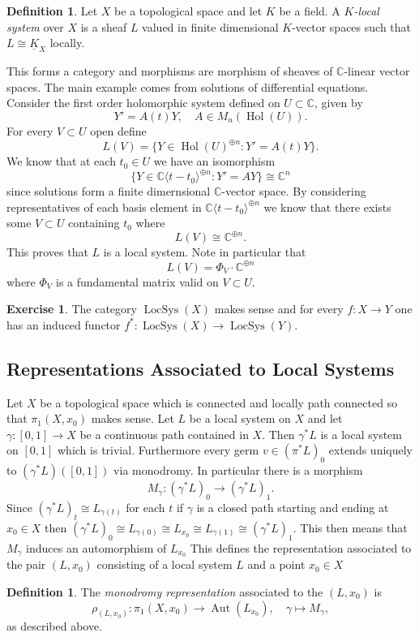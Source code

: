 \documentclass[12pt]{book}
\numberwithin{equation}{section}
\theoremstyle{definition}
\newtheorem{definition}[theorem]{Definition}
\newtheorem{exercise}[theorem]{Exercise}
\theoremstyle{remark}
\newcommand{\CC}{\mathbb{C}}
\newcommand{\Aut}{\operatorname{Aut}}
\newcommand{\hol}{\operatorname{Hol}}
\newcommand{\LocSys}{\operatorname{LocSys}}
\begin{document}
\begin{definition}
	Let $X$ be a topological space and let $K$ be a field. 
	A \emph{$K$-local system} over $X$ is a sheaf $L$ valued in finite dimensional $K$-vector spaces such that $L \cong \underline{K}_X$ locally. 
\end{definition}
This forms a category and morphisms are morphism of sheaves of $\CC$-linear vector spaces. 
The main example comes from solutions of differential equations. 
Consider the first order holomorphic system defined on $U \subset \CC$, given by 
$$ Y' = A(t) Y, \quad A \in M_n(\hol(U)).$$
For every $V \subset U$ open define  
$$ L(V) = \lbrace Y \in \hol(U)^{\oplus n} \colon Y' = A(t) Y \rbrace.$$
We know that at each $t_0 \in U$ we have an isomorphism 
$$ \lbrace Y \in \CC\langle t-t_0 \rangle^{\oplus n} \colon Y'=AY \rbrace \cong \CC^n $$
since solutions form a finite dimernsional $\CC$-vector space. 
By considering representatives of each basis element in $\CC\langle t-t_0 \rangle^{\oplus n}$ we know that there exists some $V \subset U$ containing $t_0$ where 
$$ L(V) \cong \CC^{\oplus n}.$$
This proves that $L$ is a local system. Note in particular that 
$$ L(V) = \Phi_V \cdot \CC^{\oplus n } $$
where $\Phi_V$ is a fundamental matrix valid on $V \subset U$. 

\begin{exercise}
	The category $\LocSys(X)$ makes sense and for every $f:X\to Y$ one has an induced functor $f^*:\LocSys(X) \to \LocSys(Y)$.
\end{exercise}


\subsection{Representations Associated to Local Systems}
Let $X$ be a topological space which is connected and locally path connected so that $\pi_1(X,x_0)$ makes sense. 
Let $L$ be a local system on $X$ and let $\gamma:[0,1] \to X$ be a continuous path contained in $X$. 
Then $\gamma^*L$ is a local system on $[0,1]$ which is trivial. 
Furthermore every germ $v \in (\pi^*L)_0$ extends uniquely to $(\gamma^*L)([0,1])$ via monodromy.
In particular there is a morphism 
$$ M_{\gamma}: (\gamma^*L)_0 \to (\gamma^*L)_1.$$
Since $(\gamma^*L)_t \cong L_{\gamma(t)}$ for each $t$ if $\gamma$ is a closed path starting and ending at $x_0\in X$ then $(\gamma^*L)_0 \cong L_{\gamma(0)} \cong L_{x_0} \cong L_{\gamma(1)} \cong (\gamma^*L)_1$.
This then means that $M_{\gamma}$ induces an automorphism of $L_{x_0}$
This defines the representation associated to the pair $(L,x_0)$ consisting of a local system $L$ and a point $x_0 \in X$
\begin{definition}
	The \emph{monodromy representation} associated to the $(L,x_0)$ is 
	$$\rho_{(L,x_0)}: \pi_1(X,x_0) \to \Aut(L_{x_0}), \quad \gamma \mapsto M_{\gamma}, $$
	as described above. 
\end{definition}
\end{document}
